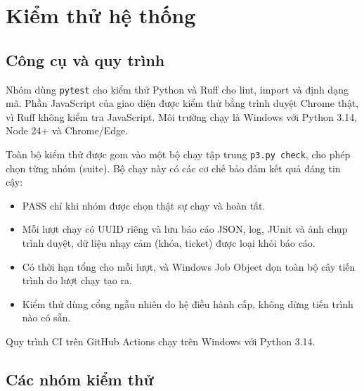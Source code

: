 \section{Kiểm thử hệ thống}

\subsection{Công cụ và quy trình}
Nhóm dùng \texttt{pytest} cho kiểm thử Python và Ruff cho lint, import và định dạng mã. Phần JavaScript của giao diện được kiểm thử bằng trình duyệt Chrome thật, vì Ruff không kiểm tra JavaScript. Môi trường chạy là Windows với Python 3.14, Node 24+ và Chrome/Edge.

Toàn bộ kiểm thử được gom vào một bộ chạy tập trung \texttt{p3.py check}, cho phép chọn từng nhóm (suite). Bộ chạy này có các cơ chế bảo đảm kết quả đáng tin cậy:
\begin{itemize}
    \item PASS chỉ khi nhóm được chọn thật sự chạy và hoàn tất.
    \item Mỗi lượt chạy có UUID riêng và lưu báo cáo JSON, log, JUnit và ảnh chụp trình duyệt, dữ liệu nhạy cảm (khóa, ticket) được loại khỏi báo cáo.
    \item Có thời hạn tổng cho mỗi lượt, và Windows Job Object dọn toàn bộ cây tiến trình do lượt chạy tạo ra.
    \item Kiểm thử dùng cổng ngẫu nhiên do hệ điều hành cấp, không dừng tiến trình nào có sẵn.
\end{itemize}

Quy trình CI trên GitHub Actions chạy trên Windows với Python 3.14.

\subsection{Các nhóm kiểm thử}



